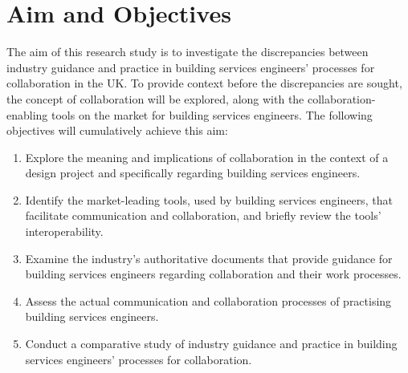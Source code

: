 \chapter{Aim and Objectives} %

\label{Chapter4} %



The aim of this research study is to investigate the discrepancies between industry guidance and practice in building services engineers' processes for collaboration in the UK.
To provide context before the discrepancies are sought, the concept of collaboration will be explored, along with the collaboration-enabling tools on the market for building services engineers.
The following objectives will cumulatively achieve this aim:
\begin{enumerate}
    \item Explore the meaning and implications of collaboration in the context of a design project and specifically regarding building services engineers.
    
    \item Identify the market-leading tools, used by building services engineers, that facilitate communication and collaboration, and briefly review the tools' interoperability.
    
    \item Examine the industry's authoritative documents that provide guidance for building services engineers regarding collaboration and their work processes.
    
    \item Assess the actual communication and collaboration processes of practising building services engineers.
    
    \item Conduct a comparative study of industry guidance and practice in building services engineers' processes for collaboration.
\end{enumerate}


